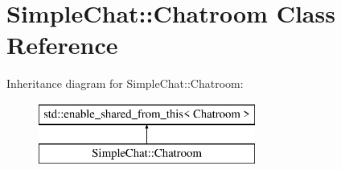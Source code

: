 \hypertarget{classSimpleChat_1_1Chatroom}{\section{Simple\-Chat\-:\-:Chatroom Class Reference}
\label{classSimpleChat_1_1Chatroom}
}
Inheritance diagram for Simple\-Chat\-:\-:Chatroom\-:\begin{figure}[H]
\begin{center}
\leavevmode
\includegraphics[height=2.000000cm]{classSimpleChat_1_1Chatroom}
\end{center}
\end{figure}
